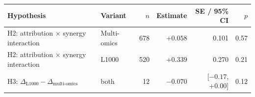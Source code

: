 \begin{tabular}{@{}llrrrr@{}}
\toprule
Hypothesis & Variant & $n$ & Estimate & SE / 95\% CI & $p$ \\
\midrule
H2: attribution $\times$ synergy interaction & Multi-omics & 678 & $+0.058$ & 0.101 & 0.57 \\
H2: attribution $\times$ synergy interaction & L1000 & 520 & $+0.339$ & 0.270 & 0.21 \\
H3: $\Delta_{\text{L1000}} - \Delta_{\text{multi-omics}}$ & both & 12 & $-0.070$ & [$-0.17$, $+0.00$] & 0.12 \\
\bottomrule
\end{tabular}
